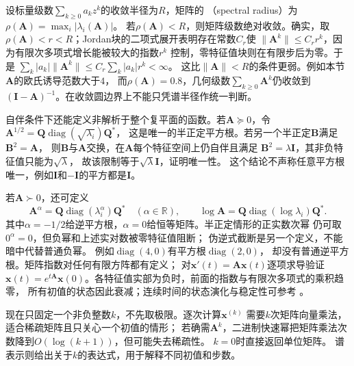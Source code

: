 设标量级数$\sum_{k\geq0}a_kz^k$的收敛半径为$R$，矩阵的
（spectral radius）为
$\rho(\bm A)=\max_i|\lambda_i(\bm A)|$。
若$\rho(\bm A)<R$，则矩阵级数绝对收敛。确实，取
$\rho(\bm A)<r<R$；Jordan块的二项式展开表明存在常数$C_r$使
$\lVert\bm A^k\rVert\leq C_r r^k$，因为有限次多项式增长能被较大的指数$r^k$
控制，零特征值块则在有限步后为零。于是
$\sum_k|a_k|\lVert\bm A^k\rVert\leq C_r\sum_k|a_k|r^k<\infty$。
这比$\lVert\bm A\rVert<R$的条件更弱。例如本节$\bm A$的欧氏诱导范数大于$4$，
而$\rho(\bm A)=0.8$，几何级数$\sum_{k\geq0}\bm A^k$仍收敛到
$(\bm I-\bm A)^{-1}$。在收敛圆边界上不能只凭谱半径作统一判断。

自伴条件下还能定义非解析于整个复平面的函数。若$\bm A\succeq0$，令
$\bm A^{1/2}=\bm Q\operatorname{diag}(\sqrt{\lambda_i})\bm Q^*$，
这是唯一的半正定平方根。若另一个半正定$\bm B$满足$\bm B^2=\bm A$，
则$\bm B$与$\bm A$交换，在$\bm A$每个特征空间上仍自伴且满足
$\bm B^2=\lambda\bm I$，其非负特征值只能为$\sqrt\lambda$，
故该限制等于$\sqrt\lambda\bm I$，证明唯一性。
这个结论不声称任意平方根唯一，例如$\bm I$和$-\bm I$的平方都是$\bm I$。

若$\bm A\succ0$，还可定义
\[
 \bm A^\alpha=\bm Q\operatorname{diag}(\lambda_i^\alpha)\bm Q^*
 \quad(\alpha\in\mathbb R),\qquad
 \log\bm A=\bm Q\operatorname{diag}(\log\lambda_i)\bm Q^*.
\]
其中$\alpha=-1/2$给逆平方根，$\alpha=0$给恒等矩阵。半正定情形的正实数次幂
仍可取$0^\alpha=0$，但负幂和上述实对数被零特征值阻断；
伪逆式截断是另一个定义，不能暗中代替普通负幂。
例如$\operatorname{diag}(4,0)$有平方根$\operatorname{diag}(2,0)$，
却没有普通逆平方根。矩阵指数对任何有限方阵都有定义；
对$\bm x'(t)=\bm A\bm x(t)$逐项求导验证
$\bm x(t)=e^{t\bm A}\bm x(0)$。各特征值实部为负时，前面的指数与有限次多项式的乘积趋零，
所有初值的状态因此衰减；连续时间的状态演化与稳定性可参考
。


现在只固定一个非负整数$k$，不先取极限。逐次计算$\bm x^{(k)}$
需要$k$次矩阵向量乘法，适合稀疏矩阵且只关心一个初值的情形；
若确需$\bm A^k$，二进制快速幂把矩阵乘法次数降到$O(\log(k+1))$，但可能失去稀疏性。
$k=0$时直接返回单位矩阵。
谱表示则给出关于$k$的表达式，用于解释不同初值和步数。


